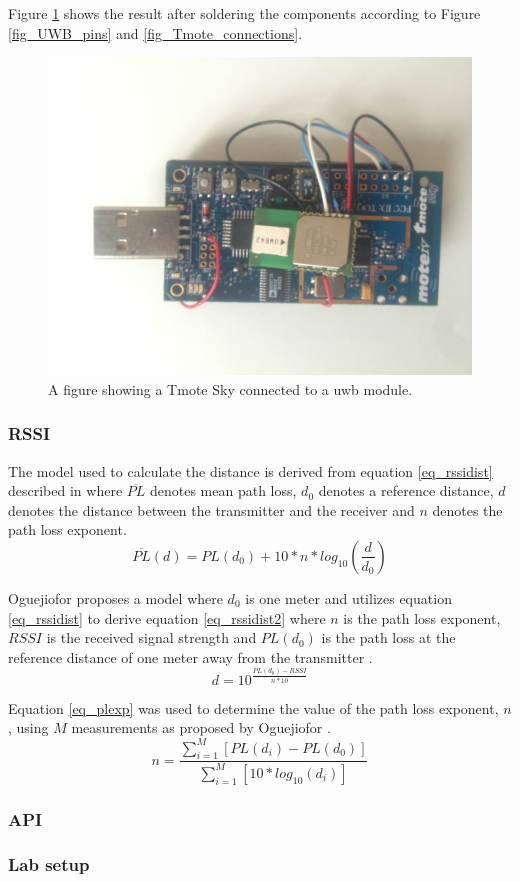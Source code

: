 			Figure \ref{fig_Tmote_UWB} shows the result after soldering the components according to Figure \ref{fig_UWB_pins} and \ref{fig_Tmote_connections}.
			\begin{figure}[H] 
			  \centering
			      \includegraphics[height=0.45\textwidth]{img/Tmote-UWB}
			  \caption{A figure showing a Tmote Sky connected to a \gls{uwb} module.}
			  \label{fig_Tmote_UWB}
			\end{figure}
		\subsubsection{RSSI}
		The model used to calculate the distance is derived from equation \ref{eq_rssidist} described in \cite{seidel_914_1992} where $\overline{PL}$ denotes mean path loss, $d_0$ denotes a reference distance, $d$ denotes the distance between the transmitter and the receiver and $n$ denotes the path loss exponent. 
		\begin{equation} \label{eq_rssidist}
		\overline{PL}(d) = PL(d_0) + 10 * n * log_{10}(\frac{d}{d_0})
		\end{equation}

		Oguejiofor proposes a model where $d_0$ is one meter and utilizes equation \ref{eq_rssidist} to derive equation \ref{eq_rssidist2} where $n$ is the path loss exponent, $RSSI$ is the received signal strength and $PL(d_0)$ is the path loss at the reference distance of one meter away from the transmitter \cite{oguejiofor_trilateration_2013}. 
		\begin{equation} \label{eq_rssidist2}
		d = 10^{\frac{PL(d_0)-RSSI}{n*10}}
		\end{equation}

		Equation \ref{eq_plexp} was used to determine the value of the path loss exponent, $n$, using $M$ measurements as proposed by Oguejiofor \cite{oguejiofor_trilateration_2013}.
		\begin{equation} \label{eq_plexp}
		n = \frac{\sum_{i=1}^{M}[PL(d_i)-PL(d_0)]}{\sum_{i=1}^{M}[10*log_{10}(d_i)]}
		\end{equation}

		\subsubsection{API}
		\subsubsection{Lab setup}
\clearpage